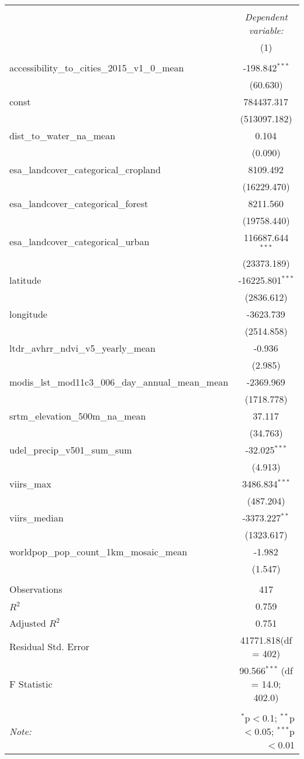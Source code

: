 \begin{table}[!htbp] \centering
\begin{tabular}{@{\extracolsep{5pt}}lc}
\\[-1.8ex]\hline
\hline \\[-1.8ex]
& \multicolumn{1}{c}{\textit{Dependent variable:}} \
\cr \cline{1-2}
\\[-1.8ex] & (1) \\
\hline \\[-1.8ex]
 accessibility_to_cities_2015_v1_0_mean & -198.842$^{***}$ \\
  & (60.630) \\
 const & 784437.317$^{}$ \\
  & (513097.182) \\
 dist_to_water_na_mean & 0.104$^{}$ \\
  & (0.090) \\
 esa_landcover_categorical_cropland & 8109.492$^{}$ \\
  & (16229.470) \\
 esa_landcover_categorical_forest & 8211.560$^{}$ \\
  & (19758.440) \\
 esa_landcover_categorical_urban & 116687.644$^{***}$ \\
  & (23373.189) \\
 latitude & -16225.801$^{***}$ \\
  & (2836.612) \\
 longitude & -3623.739$^{}$ \\
  & (2514.858) \\
 ltdr_avhrr_ndvi_v5_yearly_mean & -0.936$^{}$ \\
  & (2.985) \\
 modis_lst_mod11c3_006_day_annual_mean_mean & -2369.969$^{}$ \\
  & (1718.778) \\
 srtm_elevation_500m_na_mean & 37.117$^{}$ \\
  & (34.763) \\
 udel_precip_v501_sum_sum & -32.025$^{***}$ \\
  & (4.913) \\
 viirs_max & 3486.834$^{***}$ \\
  & (487.204) \\
 viirs_median & -3373.227$^{**}$ \\
  & (1323.617) \\
 worldpop_pop_count_1km_mosaic_mean & -1.982$^{}$ \\
  & (1.547) \\
\hline \\[-1.8ex]
 Observations & 417 \\
 $R^2$ & 0.759 \\
 Adjusted $R^2$ & 0.751 \\
 Residual Std. Error & 41771.818(df = 402)  \\
 F Statistic & 90.566$^{***}$ (df = 14.0; 402.0) \\
\hline
\hline \\[-1.8ex]
\textit{Note:} & \multicolumn{1}{r}{$^{*}$p$<$0.1; $^{**}$p$<$0.05; $^{***}$p$<$0.01} \\
\end{tabular}
\end{table}